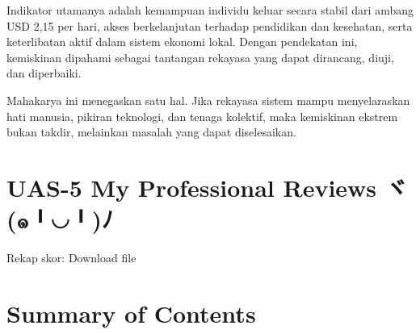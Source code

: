 \documentclass[
  letterpaper,
  DIV=11,
  numbers=noendperiod]{scrreprt}
\begin{document}
Indikator utamanya adalah kemampuan individu keluar secara stabil dari
ambang USD 2,15 per hari, akses berkelanjutan terhadap pendidikan dan
kesehatan, serta keterlibatan aktif dalam sistem ekonomi lokal. Dengan
pendekatan ini, kemiskinan dipahami sebagai tantangan rekayasa yang
dapat dirancang, diuji, dan diperbaiki.

Mahakarya ini menegaskan satu hal. Jika rekayasa sistem mampu
menyelaraskan hati manusia, pikiran teknologi, dan tenaga kolektif, maka
kemiskinan ekstrem bukan takdir, melainkan masalah yang dapat
diselesaikan.


\chapter{UAS-5 My Professional Reviews
ヾ(๑╹◡╹)ﾉ}\label{uas-5-my-professional-reviews-ux30feuxe51uxff89}

Rekap skor: Download file


\chapter{Summary of Contents}\label{summary-of-contents}
\end{document}
